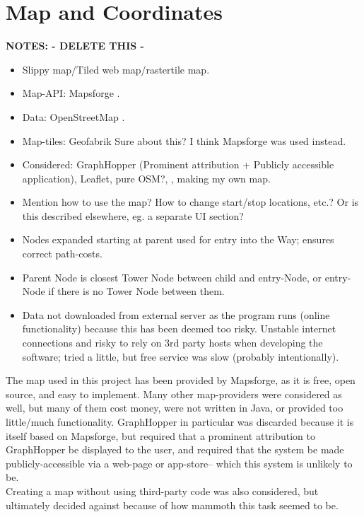 \section{Map and Coordinates}
\textbf{NOTES: - DELETE THIS -}
\begin{itemize}
	\item Slippy map/Tiled web map/rastertile map.
	\item Map-API: Mapsforge \cite{Mapsforge}.
	\item Data: OpenStreetMap \cite{OSM}.
	\item Map-tiles: Geofabrik\cite{geofabrik} Sure about this? I think Mapsforge\cite{Mapsforge_map-tiles} was used instead.
	\item Considered: GraphHopper (Prominent attribution + Publicly accessible application), Leaflet, pure OSM?, , making my own map.
	\item Mention how to use the map? How to change start/stop locations, etc.? Or is this described elsewhere, eg. a separate UI section?
	\item Nodes expanded starting at parent used for entry into the Way; ensures correct path-costs.
	\item Parent Node is closest Tower Node between child and entry-Node, or entry-Node if there is no Tower Node between them.
		\item Data not downloaded from external server as the program runs (online functionality) because this has been deemed too risky. Unstable internet connections and risky to rely on 3rd party hosts when developing the software; tried a little, but free service was slow (probably intentionally).
\end{itemize}

The map used in this project has been provided by Mapsforge\cite{Mapsforge,Mapsforge_map-tiles}, as it is free, open source, and easy to implement.
Many other map-providers were considered as well\cite{Graphhopper,mapbox,cloudmade,omniscale,openlayers,GoogleMaps,osrm,geofabrik}, but many of them cost money, were not written in Java, or provided too little/much functionality. GraphHopper\cite{Graphhopper} in particular was discarded because it is itself based on Mapsforge\cite{Mapsforge}, but required that a prominent attribution to GraphHopper be displayed to the user, and required that the system be made publicly-accessible via a web-page or app-store-- which this system is unlikely to be.\\
Creating a map without using third-party code was also considered, but ultimately decided against because of how mammoth this task seemed to be.

